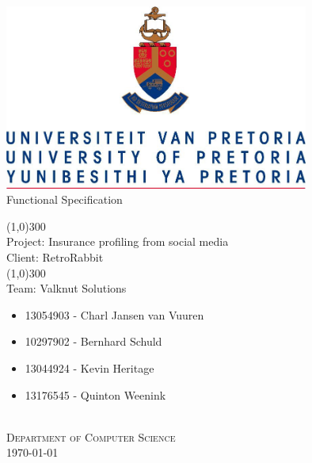 \documentclass{article}
\begin{document}
	\begin{titlepage}
		\begin{center}
			\includegraphics[width=10cm]{images/UP.jpg}  \\
			[0.5cm]
			\huge{
			Functional Specification\\
			}

			\line(1,0){300}\\
			[0.2cm]
			\LARGE{Project: Insurance profiling from social media\\
			Client: RetroRabbit} \\
			\line(1,0){300}\\
			\LARGE{Team: Valknut Solutions}\\
			[1.0cm]
			\large
			{
			\begin{itemize}
				\item 13054903 - Charl Jansen van Vuuren
				\item 10297902 - Bernhard Schuld
				\item 13044924 - Kevin Heritage
				\item 13176545 - Quinton Weenink\\
			\end{itemize}
			}
			\textsc{\large}\\
		[3.0cm]
		\textsc{\large  Department of Computer Science}\\
		[0.5cm]
		\textsc{\large \today}\\
		\end{center}


	\end{titlepage}
	\cleardoublepage
	\tableofcontents
	\cleardoublepage
	\begin{versionhistory}
	\end{versionhistory}
\end{document}
